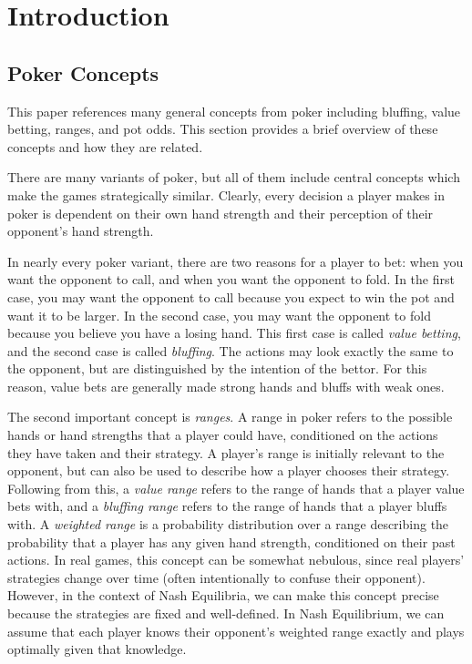 \documentclass[../../main/main.tex]{subfiles}
\begin{document}
\section{Introduction}


\subsection{Poker Concepts}

This paper references many general concepts from poker including bluffing, value betting, ranges, and pot odds. This section provides a brief overview of these concepts and how they are related.

There are many variants of poker, but all of them include central concepts which make the games strategically similar. Clearly, every decision a player makes in poker is dependent on their own hand strength and their perception of their opponent's hand strength. 

In nearly every poker variant, there are two reasons for a player to bet: when you want the opponent to call, and when you want the opponent to fold. In the first case, you may want the opponent to call because you expect to win the pot and want it to be larger. In the second case, you may want the opponent to fold because you believe you have a losing hand. This first case is called \textit{value betting}, and the second case is called \textit{bluffing}. The actions may look exactly the same to the opponent, but are distinguished by the intention of the bettor. For this reason, value bets are generally made strong hands and bluffs with weak ones.

The second important concept is \textit{ranges}. A range in poker refers to the possible hands or hand strengths that a player could have, conditioned on the actions they have taken and their strategy. A player's range is initially relevant to the opponent, but can also be used to describe how a player chooses their strategy. Following from this, a \textit{value range} refers to the range of hands that a player value bets with, and a \textit{bluffing range} refers to the range of hands that a player bluffs with. A \textit{weighted range} is a probability distribution over a range describing the probability that a player has any given hand strength, conditioned on their past actions. In real games, this concept can be somewhat nebulous, since real players' strategies change over time (often intentionally to confuse their opponent). However, in the context of Nash Equilibria, we can make this concept precise because the strategies are fixed and well-defined. In Nash Equilibrium, we can assume that each player knows their opponent's weighted range exactly and plays optimally given that knowledge. 
\end{document}
